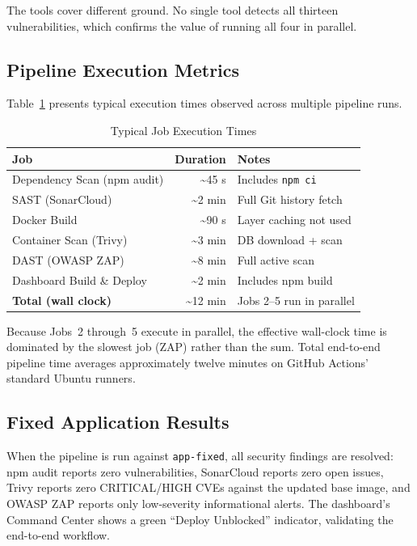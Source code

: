 \documentclass[10pt,conference]{IEEEtran}
\begin{document}
The tools cover different ground.
No single tool detects all thirteen vulnerabilities, which confirms the
value of running all four in parallel.

\subsection{Pipeline Execution Metrics}

Table~\ref{tab:timing} presents typical execution times observed across
multiple pipeline runs.

\begin{table}[t]
  \caption{Typical Job Execution Times}
  \label{tab:timing}
  \centering
  \scriptsize
  \begin{tabular}{@{}lrl@{}}
    \toprule
    Job & Duration & Notes \\
    \midrule
    Dependency Scan (npm audit) &  \textasciitilde{}45 s  & Includes \texttt{npm ci} \\
    SAST (SonarCloud)           &  \textasciitilde{}2 min & Full Git history fetch \\
    Docker Build                &  \textasciitilde{}90 s  & Layer caching not used \\
    Container Scan (Trivy)      &  \textasciitilde{}3 min & DB download + scan \\
    DAST (OWASP ZAP)            &  \textasciitilde{}8 min & Full active scan \\
    Dashboard Build \& Deploy   &  \textasciitilde{}2 min & Includes npm build \\
    \midrule
    \textbf{Total (wall clock)} & \textasciitilde{}12 min & Jobs 2--5 run in parallel \\
    \bottomrule
  \end{tabular}
\end{table}

Because Jobs~2 through~5 execute in parallel, the effective wall-clock time
is dominated by the slowest job (ZAP) rather than the sum.
Total end-to-end pipeline time averages approximately twelve minutes on
GitHub Actions' standard Ubuntu runners.

\subsection{Fixed Application Results}

When the pipeline is run against \texttt{app-fixed}, all security findings
are resolved:
npm audit reports zero vulnerabilities, SonarCloud reports zero open issues,
Trivy reports zero CRITICAL/HIGH CVEs against the updated base image, and
OWASP ZAP reports only low-severity informational alerts.
The dashboard's Command Center shows a green ``Deploy Unblocked'' indicator,
validating the end-to-end workflow.
\end{document}

